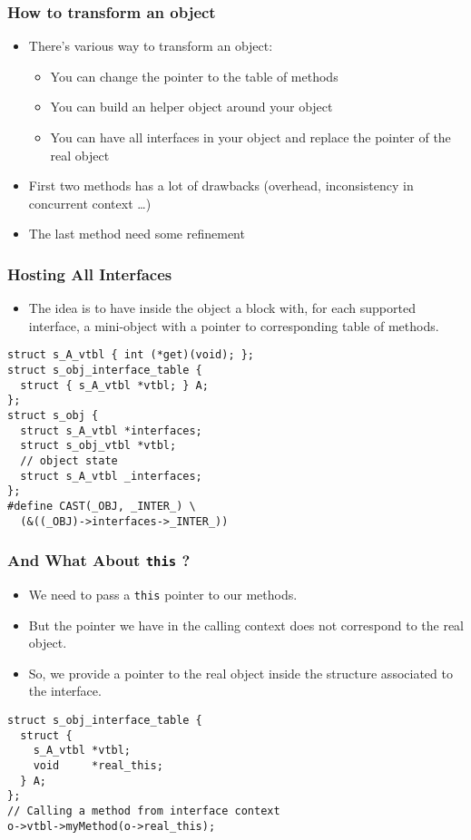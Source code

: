 \documentclass{beamer}
\begin{document}
\begin{frame}
  \frametitle{How to transform an object}
  \begin{itemize}
  \item There's various way to transform an object:
    \begin{itemize}
    \item You can change the pointer to the table of methods
    \item You can build an helper object around your object
    \item You can have all interfaces in your object and replace the pointer
      of the real object
    \end{itemize}
  \item First two methods has a lot of drawbacks (overhead, inconsistency in
    concurrent context \ldots )
  \item The last method need some refinement
  \end{itemize}
\end{frame}

\begin{frame}[fragile]
  \frametitle{Hosting All Interfaces}
  \begin{itemize}
  \item The idea is to have inside the object a block with, for each supported
    interface, a mini-object with a pointer to corresponding table of methods.
  \end{itemize}
  \begin{BoxedExample}
    \footnotesize
\begin{lstlisting}
struct s_A_vtbl { int (*get)(void); };
struct s_obj_interface_table {
  struct { s_A_vtbl *vtbl; } A;
};
struct s_obj {
  struct s_A_vtbl *interfaces;
  struct s_obj_vtbl *vtbl;
  // object state
  struct s_A_vtbl _interfaces;
};
#define CAST(_OBJ, _INTER_) \
  (&((_OBJ)->interfaces->_INTER_))
\end{lstlisting}
  \end{BoxedExample}
\end{frame}

\begin{frame}[fragile]
  \frametitle{And What About \texttt{this} ?}
  \begin{itemize}
  \item We need to pass a \texttt{this} pointer to our methods.
  \item But the pointer we have in the calling context does not correspond to
    the real object.
  \item So, we provide a pointer to the real object inside the structure
    associated to the interface.
  \end{itemize}
  \begin{BoxedExample}
    \footnotesize
\begin{lstlisting}
struct s_obj_interface_table {
  struct {
    s_A_vtbl *vtbl;
    void     *real_this;
  } A;
};
// Calling a method from interface context
o->vtbl->myMethod(o->real_this);
\end{lstlisting}
  \end{BoxedExample}
\end{frame}
\end{document}

